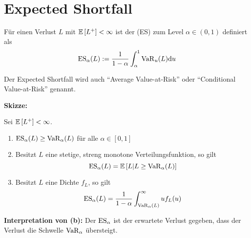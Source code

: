 \section{Expected Shortfall}
\begin{*definition}
	Für einen Verlust $L$ mit $\mathbb{E} \left[ L^+ \right] < \infty$ ist der  (ES) zum Level $\alpha \in (0,1)$ definiert als
	\begin{equation*}
	\operatorname{ES}_\alpha(L) \mathrel{:=} \frac{1}{1-\alpha} \int_\alpha^1 \operatorname{VaR}_u(L) \mathrm{d}{u}
	\end{equation*}
\end{*definition}

\begin{*bemerkung_inline}
	Der Expected Shortfall wird auch \enquote{Average Value-at-Risk} oder \enquote{Conditional Value-at-Risk} genannt.
\end{*bemerkung_inline}

\textbf{Skizze:} %

\pagebreak

\begin{theorem}
	Sei $\mathbb{E} \left[ L^+ \right] < \infty$.
	\begin{enumerate}[label=(\alph*), nolistsep]
		\item $\operatorname{ES}_\alpha(L) \ge \operatorname{VaR}_\alpha(L)$ für alle $\alpha \in [0,1]$
		\item Besitzt $L$ eine stetige, streng monotone Verteilungsfunktion, so gilt
		\begin{equation*}
			\operatorname{ES}_\alpha(L) = \mathbb{E} \left[ L | L \ge \operatorname{VaR}_\alpha(L) \right]
		\end{equation*}
		\item Besitzt $L$ eine Dichte $f_L$, so gilt
		\begin{equation*}
			\operatorname{ES}_\alpha(L) = \frac{1}{1-\alpha} \int_{\operatorname{VaR}_\alpha(L)}^\infty u f_L(u)
		\end{equation*}
	\end{enumerate}
\end{theorem}

\textbf{Interpretation von (b):} Der $\operatorname{ES}_\alpha$ ist der erwartete Verlust gegeben, dass der Verlust die Schwelle $\operatorname{VaR}_\alpha$ übersteigt.

